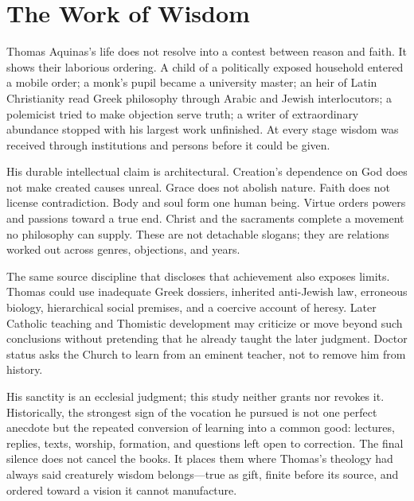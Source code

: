 \section{The Work of Wisdom}

Thomas Aquinas's life does not resolve into a contest between reason and faith.
It shows their laborious ordering.  A child of a politically exposed household
entered a mobile order; a monk's pupil became a university master; an heir of
Latin Christianity read Greek philosophy through Arabic and Jewish
interlocutors; a polemicist tried to make objection serve truth; a writer of
extraordinary abundance stopped with his largest work unfinished.  At every
stage wisdom was received through institutions and persons before it could be
given.

His durable intellectual claim is architectural.  Creation's dependence on God
does not make created causes unreal.  Grace does not abolish nature.  Faith does
not license contradiction.  Body and soul form one human being.  Virtue orders
powers and passions toward a true end.  Christ and the sacraments complete a
movement no philosophy can supply.  These are not detachable slogans; they are
relations worked out across genres, objections, and years.

The same source discipline that discloses that achievement also exposes limits.
Thomas could use inadequate Greek dossiers, inherited anti-Jewish law,
erroneous biology, hierarchical social premises, and a coercive account of
heresy.  Later Catholic teaching and Thomistic development may criticize or
move beyond such conclusions without pretending that he already taught the
later judgment.  Doctor status asks the Church to learn from an eminent
teacher, not to remove him from history.

His sanctity is an ecclesial judgment; this study neither grants nor revokes
it.  Historically, the strongest sign of the vocation he pursued is not one
perfect anecdote but the repeated conversion of learning into a common good:
lectures, replies, texts, worship, formation, and questions left open to
correction.  The final silence does not cancel the books.  It places them where
Thomas's theology had always said creaturely wisdom belongs---true as gift,
finite before its source, and ordered toward a vision it cannot manufacture.
